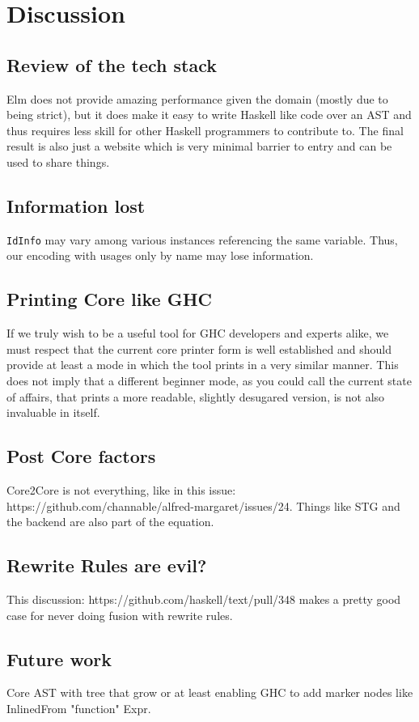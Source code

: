 \documentclass{report}
\newcommand{\mono}{\texttt}
\begin{document}

\newpage

\chapter{Discussion}

\section{Review of the tech stack}
Elm does not provide amazing performance given the domain (mostly due to being strict),
but it does make it easy to write Haskell like code over an AST and thus requires less skill
for other Haskell programmers to contribute to. The final result is also just a website which is
very minimal barrier to entry and can be used to share things.

\section{Information lost}
\mono{IdInfo} may vary among various instances referencing the same variable. Thus, our encoding with
usages only by name may lose information.

\section{Printing Core like GHC}
If we truly wish to be a useful tool for GHC developers and experts alike, we must respect
that the current core printer form is well established and should provide at least a mode in which
the tool prints in a very similar manner. This does not imply that a different beginner mode, as you
could call the current state of affairs, that prints a more readable, slightly desugared version, 
is not also invaluable in itself.

\section{Post Core factors}
Core2Core is not everything, like in this issue: https://github.com/channable/alfred-margaret/issues/24.
Things like STG and the backend are also part of the equation.

\section{Rewrite Rules are evil?}
This discussion: https://github.com/haskell/text/pull/348 makes a pretty good case for never doing fusion with
rewrite rules.

\section{Future work}
Core AST with tree that grow or at least enabling GHC to add marker nodes like InlinedFrom "function" Expr.




\appendix
\clearpage
{}
\end{document}
